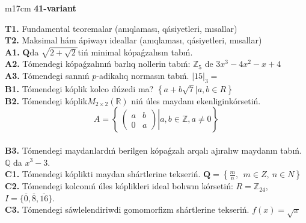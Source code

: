 \documentclass{article}
\begin{document}
\begin{tabular}{m{17cm}}
\textbf{41-variant}
\newline

\textbf{T1.} Fundamental teoremalar (anıqlaması, qásiyetleri, mısallar) \\
\textbf{T2.} Maksimal hám ápiwayı ideallar (anıqlaması, qásiyetleri, mısallar) \\
\textbf{A1.} \(\mathbf{Q}\)da \(\sqrt{2 + \sqrt{2}}\)tiń minimal kópaǵzalısın tabıń. \\
\textbf{A2.} Tómendegi kópaǵzalınıń barlıq nollerin tabıń: \(\mathbb{Z}_{5}\) de \(3x^{3} - 4x^{2} - x + 4\) \\
\textbf{A3.} Tómendegi sannıń \(p\)-adikalıq normasın tabıń. \(|15|_{3} =\) \\
\textbf{B1.} Tómendegi kóplik kolco dúzedi ma? \(\left\{ a + b\sqrt{7}|a,b \in R \right\}\) \\
\textbf{B2.} Tómendegi kóplik\(M_{2 \times 2}\left( \mathbb{R} \right)\) niń úles maydanı ekenliginkórsetiń.
\[A = \left\{ \left. \ \begin{pmatrix}
a & b \\
0 & a
\end{pmatrix} \right|a,b\mathbb{\in Z},a \neq 0 \right\}\] \\
\textbf{B3.} Tómendegi maydanlardıń berilgen kópaǵzalı arqalı ajıralıw maydanın tabıń. \(\mathbb{Q}\) da \(x^{3} - 3\). \\
\textbf{C1.} Tómendegi kóplikti maydan shártlerine tekseriń. \(\mathbf{Q} = \left\{ \frac{m}{n},\ \ m \in Z,\ n \in N \right\}\) \\
\textbf{C2.} Tómendegi kolconıń úles kóplikleri ideal bolıwın kórsetiń:
\(R = \mathbb{Z}_{24}\), \(I = \{\overline{0},\overline{8},\overline{16}\}\). \\
\textbf{C3.} Tómendegi sáwlelendiriwdi gomomorfizm shártlerine tekseriń. \(f(x) = \sqrt{x}\) \\

\end{tabular}
\vspace{1cm}
\end{document}
